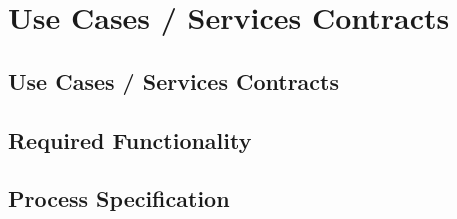 \documentclass[11pt,a4paper,titlepage]{article}
\begin{document}
		
		
	
	\section{Use Cases / Services Contracts}

	\subsection{Use Cases / Services Contracts}

		
		
		
	
	\subsection{Required Functionality}
		
		
		
	
	\subsection{Process Specification}
		
		
	

	
\end{document}
